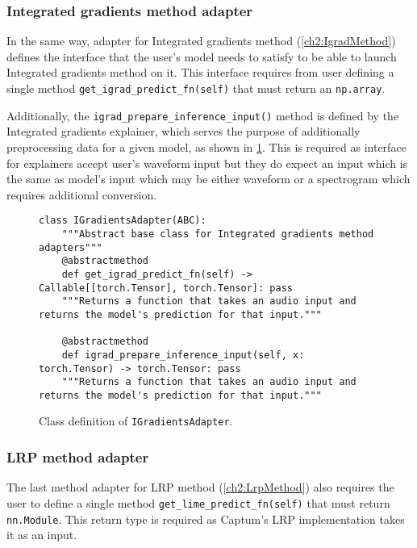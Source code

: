 \documentclass[
    bindingoffset=5mm,  %
    footnoteindent=3mm, %
    hyphenation=true    %
]{src/wut-thesis}
\begin{document}
\subsubsection{Integrated gradients method adapter}

    In the same way, adapter for Integrated gradients method (\ref{ch2:IgradMethod}) defines the interface that the
    user's model needs to satisfy to be able to launch Integrated gradients method on it.
    This interface requires from user defining a single method \texttt{get_igrad_predict_fn(self)}
    that must return an \texttt{np.array}.

    Additionally, the \texttt{igrad_prepare_inference_input()} method is defined by the Integrated gradients explainer,
    which serves the purpose of additionally preprocessing data for a given model, as shown in
    \ref{fig:IGradientsAdapter}. This is required as interface for explainers accept user's waveform input but they
    do expect an input which is the same as model's input which may be either waveform or a spectrogram which
    requires additional conversion.

\begin{figure}%
\begin{verbatim}
class IGradientsAdapter(ABC):
    """Abstract base class for Integrated gradients method adapters"""
    @abstractmethod
    def get_igrad_predict_fn(self) -> Callable[[torch.Tensor], torch.Tensor]: pass
    """Returns a function that takes an audio input and returns the model's prediction for that input."""

    @abstractmethod
    def igrad_prepare_inference_input(self, x: torch.Tensor) -> torch.Tensor: pass
    """Returns a function that takes an audio input and returns the model's prediction for that input."""
\end{verbatim}
\caption{Class definition of \texttt{IGradientsAdapter}.}
\label{fig:IGradientsAdapter}
\end{figure}

\subsubsection{LRP method adapter}

    The last method adapter for LRP method (\ref{ch2:LrpMethod}) also requires the user to define a single method \texttt{get_lime_predict_fn(self)} that must return \texttt{nn.Module}. This return type is required as Captum's LRP implementation takes it as an input.
\end{document}
